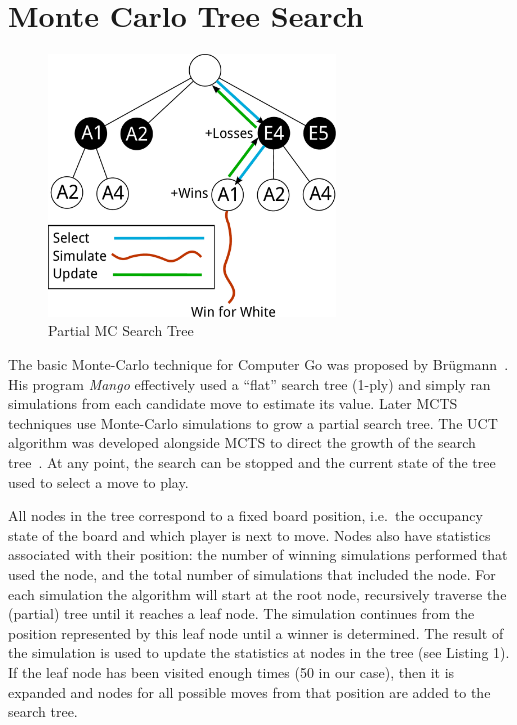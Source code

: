 \documentclass{acm_proc_article-sp}
\begin{document}
\section{Monte Carlo Tree Search} \label{mcts}

\begin{figure}
	\begin{center}
	\includegraphics[width=3.0in]{graphics/tree.pdf}
	\end{center}
	\caption{Partial MC Search Tree}
	\label{fig:tree}
\end{figure}


The basic Monte-Carlo technique for Computer Go was proposed by Br\"{u}gmann~\cite{brugmann1993monte}. His program \emph{Mango} effectively used a ``flat'' search tree (1-ply) and simply ran simulations from each candidate move to estimate its value. 
Later MCTS techniques use Monte-Carlo simulations to grow a partial  search tree. 
The UCT algorithm was developed alongside MCTS to direct the growth of the search tree~\cite{gelly2006exploration}. 
At any point, the search can be stopped and the current state of the tree used to select a move to play. 

All nodes in the tree correspond to a fixed board position, i.e.~the occupancy state of the board and which player is next to move. 
Nodes also have statistics associated with their position:  the number of winning simulations performed that used the node, and the total number of simulations that included the node. 
For each simulation the algorithm will start at the root node, recursively traverse the (partial) tree until it reaches a leaf node.
The simulation continues from the position represented by this leaf node until a winner is determined.
The result of the simulation is used to update the statistics at nodes in the tree
(see Listing 1).
If the leaf node has been visited enough times (50 in our case), then it is expanded and nodes for all possible moves from 
that position are added to the search tree.
\end{document}
